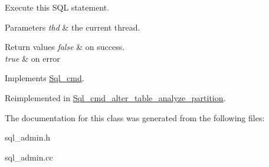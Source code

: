 Execute this S\+QL statement. 
\begin{DoxyParams}{Parameters}
{\em thd} & the current thread. \\
\hline
\end{DoxyParams}

\begin{DoxyRetVals}{Return values}
{\em false} & on success. \\
\hline
{\em true} & on error \\
\hline
\end{DoxyRetVals}


Implements \mbox{\hyperlink{classSql__cmd_a213367b79b551296fbb7790f2a3732fb}{Sql\+\_\+cmd}}.



Reimplemented in \mbox{\hyperlink{classSql__cmd__alter__table__analyze__partition_a71c5e17563536e65e9a048a1205b4fbd}{Sql\+\_\+cmd\+\_\+alter\+\_\+table\+\_\+analyze\+\_\+partition}}.



The documentation for this class was generated from the following files\+:\begin{DoxyCompactItemize}
\item 
sql\+\_\+admin.\+h\item 
sql\+\_\+admin.\+cc\end{DoxyCompactItemize}
